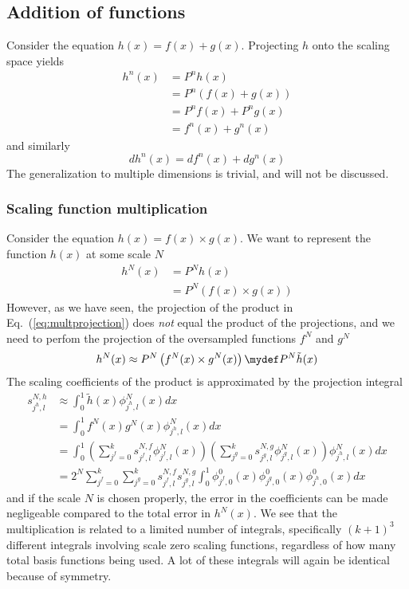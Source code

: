 \pagebreak

\subsection{Addition of functions}
Consider the equation $h(x) = f(x)+g(x)$. Projecting $h$ onto the scaling
space yields
\begin{align}
    \nonumber
    h^n(x)  &= P^nh(x)\\
    \nonumber
    	    &= P^n\left(f(x)+g(x)\right)\\
    \nonumber
	    &= P^nf(x)+P^ng(x)\\
    \label{eq:scalingadd}
	    &= f^n(x)+g^n(x)
\end{align}
and similarly
\begin{equation}
    \label{eq:waveletadd}
    dh^n(x) = df^n(x)+dg^n(x)
\end{equation}
The generalization to multiple dimensions is trivial, and will not be discussed.

\subsubsection*{Scaling function multiplication}
Consider the equation $h(x) = f(x)\times g(x)$. We want to represent the
function $h(x)$ at some scale $N$ 
\begin{align}
    \nonumber
    h^N(x)  &= P^Nh(x)\\
    \label{eq:multprojection}
	    &= P^N\left(f(x)\times g(x)\right)
\end{align}
However, as we have seen, the projection of the product in
Eq.~(\ref{eq:multprojection}) does \emph{not} equal the product of the
projections, and we need to perfom the projection of the oversampled 
functions $f^N$ and $g^N$
\begin{equation}
    h^N(x) \approx P^N\left(f^N(x) \times g^N(x)\right) \mydef P^N\tilde{h}(x)
\end{equation}
The scaling coefficients of the product is approximated by the projection integral
\begin{align}
    \nonumber
    s^{N,h}_{j^h,l} 
    &\approx \int_0^1	\tilde{h}(x)\phi_{j^h,l}^N(x)dx\\
    \nonumber
    &= \int_0^1 f^N(x)g^N(x)\phi^N_{j^h,l}(x)dx\\
    \nonumber
    &= \int_0^1 
    \left(\sum_{j^f=0}^k s^{N,f}_{j^f,l} \phi^N_{j^f,l}(x)\right)
    \left(\sum_{j^g=0}^k s^{N,g}_{j^g,l} \phi^N_{j^g,l}(x)\right)
    \phi_{j^h,l}^N(x)dx\\
    &= 2^N \sum_{j^f=0}^k\sum_{j^g=0}^k 
    s_{j^f,l}^{N,f} s_{j^g,l}^{N,g} \int_0^1 
    \phi_{j^f,0}^0(x)\phi_{j^g,0}^0(x)\phi_{j^h,0}^0(x)dx
    \label{eq:multexpansion}
\end{align}
and if the scale $N$ is chosen properly, the error in the coefficients can
be made negligeable compared to the total error in $h^N(x)$. We see that the
multiplication is related to a limited number of integrals, specifically 
$(k+1)^3$ different integrals involving scale zero scaling functions, 
regardless of how many total basis functions being used. A lot of these 
integrals will again be identical because of symmetry.

